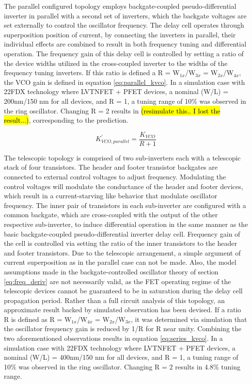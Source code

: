 			The parallel configured topology employs backgate-coupled pseudo-differential inverter in parallel with a second set of inverters, which the backgate voltages are set externally to control the oscillator frequency. The delay cell operates through superposition position of current, by connecting the inverters in parallel, their individual effects are combined to result in both frequency tuning and differential operation. The frequency gain of this delay cell is controlled by setting a ratio of the device widths utilized in the cross-coupled inverter to the widths of the frequency tuning inverters. If this ratio is defined a R = W$_{1x}$/W$_{3x}$ = W$_{2x}$/W$_{4x}$, the VCO gain is defined in equation \ref{eq:parallel_kvco}. In a simulation case with 22FDX technology where LVTNFET + PFET devices, a nominal (W/L) = 200nm/150 nm for all devices, and R = 1, a tuning range of 10\% was observed in the ring oscillator. Changing R = 2 results in \hl{(resimulate this.. I lost the result...)}, corresponding to the prediction. 

			\begin{equation}\label{eq:parallel_kvco}
				K_{VCO,parallel}^{'} = \frac{K_{VCO}}{R + 1}
			\end{equation}

			The telescopic topology is comprised of two sub-inverters each with a telescopic stack of four transistors. The header and footer transistor backgates are connected to external control voltages to adjust frequency. Modulating the control voltages will modulate the conductance of the header and footer devices, which result in a current-starving like behavior that modulate oscillator frequency. The inner pair of transistors in each sub-inverter are configured with a common backgate, which are cross-coupled with the output of the other respective sub-inverter, to induce differential operation in the same manner as the basic backgate-coupled pseudo-differential inverter delay cell. Frequency gain of the cell is controlled via setting the ratio of the inner transistors to the header and footer transistors. Due to the telescopic arrangement, a simple argument of current superposition as in the parallel case can not be made. Also, the model assumptions made in the backgate-controlled oscillator theory of section \ref{eq:freq_deriv} are not necessarily valid, as the FET operating regime of the telescopic devices cannot be guaranteed to be in saturation during the delay cell propagation period. Rather than a full circuit analysis of this topology, an approximate result backed by simulated observation has been devised. If a ratio R is defined as R = W$_{1x}$/W$_{4x}$ = W$_{2x}$/W$_{3x}$, it was determined via simulation that the oscillator frequency gain is reduced by 1/R for R near unity. Combining the two aforementioned observations results in equation \ref{eq:series_kvco}. In a simulation case with 22FDX technology where LVTNFET + PFET devices, a nominal (W/L) = 400nm/150 nm for all devices, and R = 1, a tuning range of 10\% was observed in the ring oscillator. Changing R = 2 results in 4.8\% tuning range.

